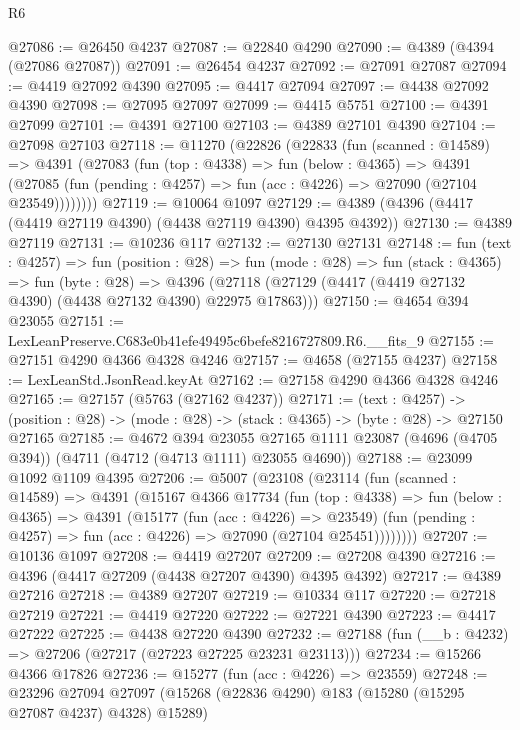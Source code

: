 \begin{lexlean}{R6}
\begin{coremodule}
@27086 := @26450 @4237
@27087 := @22840 @4290
@27090 := @4389 (@4394 (@27086 @27087))
@27091 := @26454 @4237
@27092 := @27091 @27087
@27094 := @4419 @27092 @4390
@27095 := @4417 @27094
@27097 := @4438 @27092 @4390
@27098 := @27095 @27097
@27099 := @4415 @5751
@27100 := @4391 @27099
@27101 := @4391 @27100
@27103 := @4389 @27101 @4390
@27104 := @27098 @27103
@27118 := @11270
    (@22826
      (@22833
        (fun (scanned : @14589) =>
        @4391
          (@27083
            (fun (top : @4338) =>
            fun (below : @4365) =>
            @4391
              (@27085 (fun (pending : @4257) => fun (acc : @4226) => @27090 (@27104 @23549))))))))
@27119 := @10064 @1097
@27129 := @4389 (@4396 (@4417 (@4419 @27119 @4390) (@4438 @27119 @4390) @4395 @4392))
@27130 := @4389 @27119
@27131 := @10236 @117
@27132 := @27130 @27131
@27148 := fun (text : @4257) =>
  fun (position : @28) =>
  fun (mode : @28) =>
  fun (stack : @4365) =>
  fun (byte : @28) =>
  @4396 (@27118 (@27129 (@4417 (@4419 @27132 @4390) (@4438 @27132 @4390) @22975 @17863)))
@27150 := @4654 @394 @23055
@27151 := LexLeanPreserve.C683e0b41efe49495c6befe8216727809.R6.__fits_9
@27155 := @27151 @4290 @4366 @4328 @4246
@27157 := @4658 (@27155 @4237)
@27158 := LexLeanStd.JsonRead.keyAt
@27162 := @27158 @4290 @4366 @4328 @4246
@27165 := @27157 (@5763 (@27162 @4237))
@27171 := (text : @4257) ->
  (position : @28) -> (mode : @28) -> (stack : @4365) -> (byte : @28) -> @27150 @27165
@27185 := @4672
    @394
    @23055
    @27165
    @1111
    @23087
    (@4696 (@4705 @394))
    (@4711 (@4712 (@4713 @1111) @23055 @4690))
@27188 := @23099 @1092 @1109 @4395
@27206 := @5007
    (@23108
      (@23114
        (fun (scanned : @14589) =>
        @4391
          (@15167
            @4366
            @17734
            (fun (top : @4338) =>
            fun (below : @4365) =>
            @4391
              (@15177
                (fun (acc : @4226) => @23549)
                (fun (pending : @4257) => fun (acc : @4226) => @27090 (@27104 @25451))))))))
@27207 := @10136 @1097
@27208 := @4419 @27207
@27209 := @27208 @4390
@27216 := @4396 (@4417 @27209 (@4438 @27207 @4390) @4395 @4392)
@27217 := @4389 @27216
@27218 := @4389 @27207
@27219 := @10334 @117
@27220 := @27218 @27219
@27221 := @4419 @27220
@27222 := @27221 @4390
@27223 := @4417 @27222
@27225 := @4438 @27220 @4390
@27232 := @27188 (fun (__b : @4232) => @27206 (@27217 (@27223 @27225 @23231 @23113)))
@27234 := @15266 @4366 @17826
@27236 := @15277 (fun (acc : @4226) => @23559)
@27248 := @23296
    @27094
    @27097
    (@15268 (@22836 @4290) @183 (@15280 (@15295 @27087 @4237) @4328) @15289)

\end{coremodule}
\end{lexlean}
